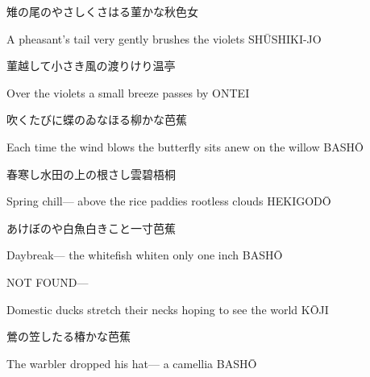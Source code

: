\begin{haiku}
    {\FH 雉の尾のやさしくさはる菫かな}\hfill{\FH 秋色女}

    \vin{} A pheasant's tail
    \vin{} \vin{} very gently brushes
    \vin{} \vin{} \vin{} the violets \hspace{\fill} SH\={U}SHIKI-JO
\end{haiku}

\begin{haiku}
    {\FH 菫越して小さき風の渡りけり}\hfill{\FH 温亭}

    \vin{} Over the violets
    \vin{} \vin{} a small breeze
    \vin{} \vin{} \vin{} passes by \hspace{\fill} ONTEI
\end{haiku}

\begin{haiku}
    {\FH 吹くたびに蝶のゐなほる柳かな}\hfill{\FH 芭蕉}

    \vin{} Each time the wind blows
    \vin{} \vin{} the butterfly sits anew
    \vin{} \vin{} \vin{} on the willow \hspace{\fill} BASH\={O}
\end{haiku}

\begin{haiku}
    {\FH 春寒し水田の上の根さし雲}\hfill{\FH 碧梧桐}

    \vin{} Spring chill---
    \vin{} \vin{} above the rice paddies
    \vin{} \vin{} \vin{} rootless clouds \hspace{\fill} HEKIGOD\={O}
\end{haiku}

\begin{haiku}
    {\FH あけぼのや白魚白きこと一寸}\hfill{\FH 芭蕉}

    \vin{} Daybreak---
    \vin{} \vin{} the whitefish whiten
    \vin{} \vin{} \vin{} only one inch \hspace{\fill} BASH\={O}
\end{haiku}

\begin{haiku}
    NOT FOUND\hfill{---}

    \vin{} Domestic ducks
    \vin{} \vin{} stretch their necks
    \vin{} \vin{} \vin{} hoping to see the world \hspace{\fill} K\={O}JI
\end{haiku}

\begin{haiku}
    {\FH 鶯の笠したる椿かな}\hfill{\FH 芭蕉}

    \vin{} The warbler
    \vin{} \vin{} dropped his hat---
    \vin{} \vin{} \vin{} a camellia \hspace{\fill} BASH\={O}
\end{haiku}

